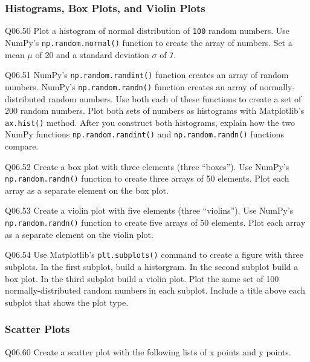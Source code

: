 \documentclass{book}
\begin{document}
    




    
        \subsubsection{Histograms, Box Plots, and Violin
Plots}\label{histograms-box-plots-and-violin-plots}

Q06.50 Plot a histogram of normal distribution of \lstinline!100! random
numbers. Use NumPy's \lstinline!np.random.normal()! function to create
the array of numbers. Set a mean \(\mu\) of 20 and a standard deviation
\(\sigma\) of \lstinline!7!.

Q06.51 NumPy's \lstinline!np.random.randint()! function creates an array
of random numbers. NumPy's \lstinline!np.random.randn()! function
creates an array of normally-distributed random numbers. Use both each
of these functions to create a set of 200 random numbers. Plot both sets
of numbers as histograms with Matplotlib's \lstinline!ax.hist()! method.
After you construct both histograms, explain how the two NumPy functions
\lstinline!np.random.randint()! and \lstinline!np.random.randn()!
functions compare.

Q06.52 Create a box plot with three elements (three ``boxes''). Use
NumPy's \lstinline!np.random.randn()! function to create three arrays of
50 elements. Plot each array as a separate element on the box plot.

Q06.53 Create a violin plot with five elements (three ``violins''). Use
NumPy's \lstinline!np.random.randn()! function to create five arrays of
50 elements. Plot each array as a separate element on the violin plot.

Q06.54 Use Matplotlib's \lstinline!plt.subplots()! command to create a
figure with three subplots. In the first subplot, build a historgram. In
the second subplot build a box plot. In the third subplot build a violin
plot. Plot the same set of 100 normally-distributed random numbers in
each subplot. Include a title above each subplot that shows the plot
type.
    




    
        \subsubsection{Scatter Plots}\label{scatter-plots}

Q06.60 Create a scatter plot with the following lists of x points and y
points.
\end{document}
